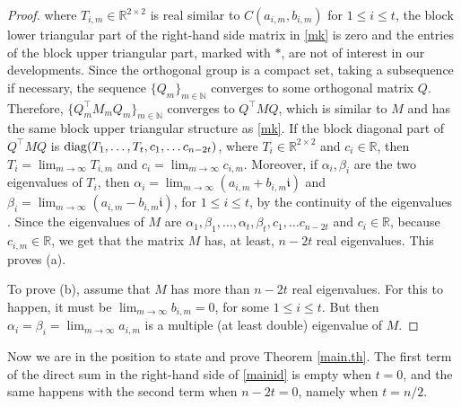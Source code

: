 \documentclass[a4paper]{article}
\newcommand{\R}{\mathbb R}
\newcommand{\ii}{\mathfrak i}
\newcommand{\diag}{{\rm diag}}
\begin{document}
\begin{proof}
where $T_{i,m} \in \R^{2 \times 2}$ is real similar to $C(a_{i,m},b_{i,m})$ for $1 \leq i \leq t$, the block lower triangular part of the right-hand side matrix in \eqref{mk} is zero and the entries of the block upper triangular part, marked with $*$, are not of interest in our developments. Since the orthogonal group is a compact set, taking a subsequence if necessary, the sequence $\{Q_m\}_{m\in\mathbb N}$ converges to some orthogonal matrix $Q$. Therefore, $\{Q_m^\top M_mQ_m\}_{m\in\mathbb N}$ converges to $Q^\top MQ$, which is similar to $M$ and has the same block upper triangular structure as \eqref{mk}. If the block diagonal part of $Q^\top MQ$ is $\diag (T_1, \ldots, T_t, c_1, \ldots c_{n-2t})$, where $T_i \in \R^{2 \times 2}$ and $c_i \in \R$, then $T_i =\lim_{m \rightarrow \infty} T_{i,m}$ and $c_i =\lim_{m \rightarrow \infty} c_{i,m}$. Moreover, if $\alpha_i , \beta_i$ are the two eigenvalues of $T_i$, then $\alpha_i = \lim_{m \rightarrow \infty} (a_{i,m} + b_{i,m} \ii)$ and  $\beta_i  = \lim_{m \rightarrow \infty} (a_{i,m} - b_{i,m} \ii)$, for $1 \leq i \leq t$, by the continuity of the eigenvalues \cite[Th. 2.4.9.2]{hj13}. Since the eigenvalues of $M$ are  $\alpha_1 , \beta_1, \ldots, \alpha_t , \beta_t, c_1, \ldots c_{n-2t}$ and $c_i\in\R$, because $c_{i,m}\in\R$, we get that the matrix $M$ has, at least, $n-2t$ real eigenvalues. This proves (a).

To prove (b), assume that $M$ has more than $n-2t$ real eigenvalues.
For this to happen, it must be $\lim_{m \rightarrow \infty} b_{i,m} = 0$, for some $1\leq i\leq t$. But then $\alpha_i = \beta_i = \lim_{m \rightarrow \infty} a_{i,m}$ is a multiple (at least double) eigenvalue of $M$.
\end{proof}


Now we are in the position to state and prove Theorem \ref{main.th}. The first term of the direct sum in the right-hand side of \eqref{mainid} is empty when $t=0$, and the same happens with the second term when $n-2t=0$, namely when $t=n/2$.
\end{document}
